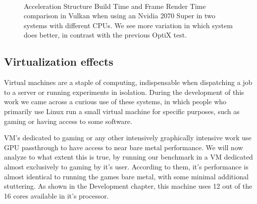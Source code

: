 \begin{figure}
    \\
    \caption{Acceleration Structure Build Time and Frame Render Time comparison in Vulkan when using an Nvidia 2070 Super in two systems with different CPUs. We see more variation in which system does better, in contrast with the previous OptiX test.}
    \label{vulkan-2070-super-comparison}
\end{figure}


\clearpage
\subsection{Virtualization effects}
Virtual machines are a staple of computing, indispensable when dispatching a job to a server or running experiments in isolation. During the development of this work we came across a curious use of these systems, in which people who primarily use Linux run a small virtual machine for specific purposes, such as gaming or having access to some software. 

VM's dedicated to gaming or any other intensively graphically intensive work use GPU passthrough to have access to near bare metal performance. We will now analyze to what extent this is true, by running our benchmark in a VM dedicated almost exclusively to gaming by it's user. According to them, it's performance is almost identical to running the games bare metal, with some minimal additional stuttering. As shown in the Development chapter, this machine uses 12 out of the 16 cores available in it's processor.

